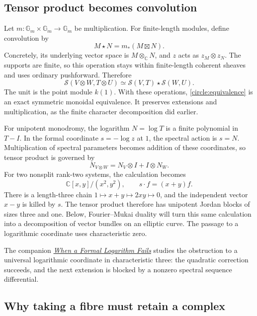 \documentclass[11pt]{article}
\theoremstyle{remark}
\newcommand{\C}{\mathbb C}
\begin{document}
\subsection{Tensor product becomes convolution}

Let \(m:\mathbb G_m\times\mathbb G_m\to\mathbb G_m\) be multiplication. For finite-length modules, define convolution by
\[
M\star N=m_*(M\boxtimes N).
\]
Concretely, its underlying vector space is \(M\otimes_{\C}N\), and \(z\) acts as \(z_M\otimes z_N\). The supports are finite, so this operation stays within finite-length coherent sheaves and uses ordinary pushforward. Therefore
\begin{equation}
\mathcal S(V\otimes W,T\otimes U)
\simeq\mathcal S(V,T)\star\mathcal S(W,U).
\label{circle:convolution}
\end{equation}
The unit is the point module \(k(1)\). With these operations, \eqref{circle:equivalence} is an exact symmetric monoidal equivalence. It preserves extensions and multiplication, as the finite character decomposition did earlier.

For unipotent monodromy, the logarithm \(N=\log T\) is a finite polynomial in \(T-I\). In the formal coordinate \(s=-\log z\) at \(1\), the spectral action is \(s=N\). Multiplication of spectral parameters becomes addition of these coordinates, so tensor product is governed by
\[
N_{V\otimes W}=N_V\otimes I+I\otimes N_W.
\]
For two nonsplit rank-two systems, the calculation becomes
\[
\C[x,y]/(x^2,y^2),\qquad s\cdot f=(x+y)f.
\]
There is a length-three chain \(1\mapsto x+y\mapsto2xy\mapsto0\), and the independent vector \(x-y\) is killed by \(s\). The tensor product therefore has unipotent Jordan blocks of sizes three and one. Below, Fourier--Mukai duality will turn this same calculation into a decomposition of vector bundles on an elliptic curve. The passage to a logarithmic coordinate uses characteristic zero.

The companion \href{https://refactor.press/notes/when-a-formal-logarithm-fails.html}{\emph{When a Formal Logarithm Fails}} studies the obstruction to a universal logarithmic coordinate in characteristic three: the quadratic correction succeeds, and the next extension is blocked by a nonzero spectral sequence differential.

\subsection{Why taking a fibre must retain a complex}
\end{document}
